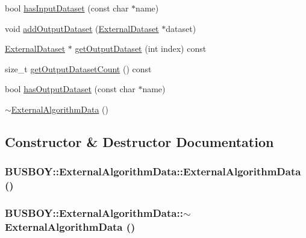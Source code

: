 \begin{DoxyCompactItemize}
bool \hyperlink{classBUSBOY_1_1ExternalAlgorithmData_aa6011ef56deb9cb0af6e7b4d7a99e163}{hasInputDataset} (const char $\ast$name)
\item 
void \hyperlink{classBUSBOY_1_1ExternalAlgorithmData_a4a62d5e653eaeef0d6b38c32621c8f75}{addOutputDataset} (\hyperlink{classBUSBOY_1_1ExternalDataset}{ExternalDataset} $\ast$dataset)
\item 
\hyperlink{classBUSBOY_1_1ExternalDataset}{ExternalDataset} $\ast$ \hyperlink{classBUSBOY_1_1ExternalAlgorithmData_a23a9764c4207820bc823cdd18a57b1e8}{getOutputDataset} (int index) const 
\item 
size\_\-t \hyperlink{classBUSBOY_1_1ExternalAlgorithmData_ab7d6f55877b974715fe830df4c1820f3}{getOutputDatasetCount} () const 
\item 
bool \hyperlink{classBUSBOY_1_1ExternalAlgorithmData_ab6b185983427eafc7309d42b5f28cffe}{hasOutputDataset} (const char $\ast$name)
\item 
\hyperlink{classBUSBOY_1_1ExternalAlgorithmData_ab362357750a9ad73e583386d6186087f}{$\sim$ExternalAlgorithmData} ()
\end{DoxyCompactItemize}


\subsection{Constructor \& Destructor Documentation}
\hypertarget{classBUSBOY_1_1ExternalAlgorithmData_abd39c63b4007893521f3af26ab042f7c}{
\subsubsection[{ExternalAlgorithmData}]{\setlength{\rightskip}{0pt plus 5cm}BUSBOY::ExternalAlgorithmData::ExternalAlgorithmData ()}}
\label{classBUSBOY_1_1ExternalAlgorithmData_abd39c63b4007893521f3af26ab042f7c}
\hypertarget{classBUSBOY_1_1ExternalAlgorithmData_ab362357750a9ad73e583386d6186087f}{
\subsubsection[{$\sim$ExternalAlgorithmData}]{\setlength{\rightskip}{0pt plus 5cm}BUSBOY::ExternalAlgorithmData::$\sim$ExternalAlgorithmData ()}}
\label{classBUSBOY_1_1ExternalAlgorithmData_ab362357750a9ad73e583386d6186087f}


